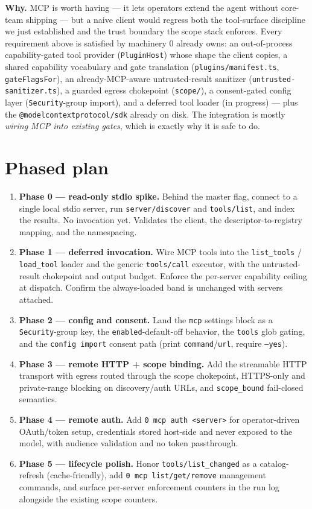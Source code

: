 \documentclass[11pt]{article}
\begin{document}
\textbf{Why.} MCP is worth having --- it lets operators extend the agent without
core-team shipping --- but a naive client would regress both the tool-surface
discipline we just established \cite{tool-curation} and the trust boundary the
scope stack enforces. Every requirement above is satisfied by machinery 0
already owns: an out-of-process capability-gated tool provider
(\texttt{PluginHost}) whose shape the client copies, a shared capability
vocabulary and gate translation (\texttt{plugins/manifest.ts},
\texttt{gateFlagsFor}), an already-MCP-aware untrusted-result sanitizer
(\texttt{untrusted-sanitizer.ts}), a guarded egress chokepoint (\texttt{scope/}),
a consent-gated config layer (\texttt{Security}-group import), and a deferred tool
loader (in progress) --- plus the \texttt{@modelcontextprotocol/sdk} already on
disk. The integration is mostly \emph{wiring MCP into existing gates}, which is
exactly why it is safe to do.

\section{Phased plan}

\begin{enumerate}[leftmargin=*]
  \item \textbf{Phase 0 --- read-only stdio spike.} Behind the master flag,
  connect to a single local stdio server, run \texttt{server/discover} and
  \texttt{tools/list}, and index the results. No invocation yet. Validates the
  client, the descriptor-to-registry mapping, and the namespacing.
  \item \textbf{Phase 1 --- deferred invocation.} Wire MCP tools into the
  \texttt{list\_tools} / \texttt{load\_tool} loader and the generic
  \texttt{tools/call} executor, with the untrusted-result chokepoint and output
  budget. Enforce the per-server capability ceiling at dispatch. Confirm the
  always-loaded band is unchanged with servers attached.
  \item \textbf{Phase 2 --- config and consent.} Land the \texttt{mcp}
  settings block as a \texttt{Security}-group key, the \texttt{enabled}-default-off
  behavior, the \texttt{tools} glob gating, and the \texttt{config import}
  consent path (print \texttt{command}/\texttt{url}, require \texttt{--yes}).
  \item \textbf{Phase 3 --- remote HTTP + scope binding.} Add the streamable
  HTTP transport with egress routed through the scope chokepoint, HTTPS-only and
  private-range blocking on discovery/auth URLs, and \texttt{scope\_bound}
  fail-closed semantics.
  \item \textbf{Phase 4 --- remote auth.} Add \texttt{0 mcp auth <server>} for
  operator-driven OAuth/token setup, credentials stored host-side and never
  exposed to the model, with audience validation and no token passthrough.
  \item \textbf{Phase 5 --- lifecycle polish.} Honor \texttt{tools/list\_changed}
  as a catalog-refresh (cache-friendly), add \texttt{0 mcp list/get/remove}
  management commands, and surface per-server enforcement counters in the run
  log alongside the existing scope counters.
\end{enumerate}
\end{document}

